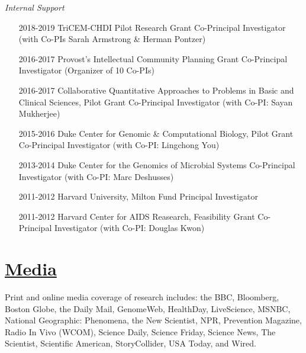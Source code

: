 \documentclass[overlapped,line,11pt]{res}
\begin{document}
\begin{resume}
\begin{itemize}[leftmargin=2cm, style=sameline]
\end{itemize}

\emph{Internal Support}
\vspace{.1in}

\begin{itemize}[leftmargin=2cm, style=sameline]

\item[2018-2019] TriCEM-CHDI Pilot Research Grant
  \newline Co-Principal Investigator (with Co-PIs Sarah Armstrong \& Herman Pontzer) 

\item[2016-2017] Provost's Intellectual Community Planning Grant
  \newline Co-Principal Investigator (Organizer of 10
  Co-PIs) 

\item[2016-2017]  Collaborative Quantitative Approaches to Problems in Basic and Clinical Sciences, Pilot Grant
  \newline Co-Principal Investigator (with Co-PI:
  Sayan Mukherjee) 

\item[2015-2016] Duke Center for Genomic \& Computational Biology, Pilot Grant
  \newline Co-Principal Investigator (with Co-PI:
  Lingchong You)

\item[2013-2014] Duke Center for the Genomics of Microbial Systems
  \newline Co-Principal Investigator (with Co-PI:
  Marc Deshusses)

\item[2011-2012] Harvard University, Milton Fund \newline
  Principal Investigator

\item[2011-2012] Harvard Center for AIDS Reasearch, Feasibility Grant \newline
  Co-Principal Investigator (with Co-PI: Douglas Kwon)

\end{itemize}

\section{\underline{\sc Media}} 
\vspace{.05in} Print and online media coverage of research includes:
the BBC, Bloomberg, Boston Globe, the Daily Mail, GenomeWeb,
HealthDay, LiveScience, MSNBC, National Geographic: Phenomena, the New
Scientist, NPR, Prevention Magazine, Radio In Vivo (WCOM), Science
Daily, Science Friday, Science News, The Scientist, Scientific
American, StoryCollider, USA Today, and Wired.


\end{resume}
\end{document}
